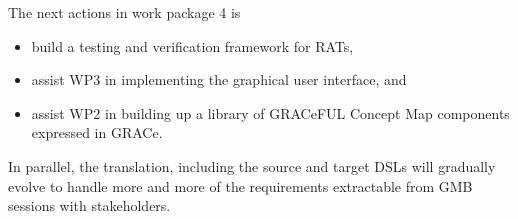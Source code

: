 \documentclass{article}
\begin{document}
The next actions in work package 4 is
\begin{itemize}
\item build a testing and verification framework for RATs,
\item assist WP3 in implementing the graphical user interface, and
\item assist WP2 in building up a library of GRACeFUL Concept Map
  components expressed in GRACe.
\end{itemize}
%
In parallel, the translation, including the source and target DSLs
will gradually evolve to handle more and more of the requirements
extractable from GMB sessions with stakeholders.

\appendix





\end{document}
